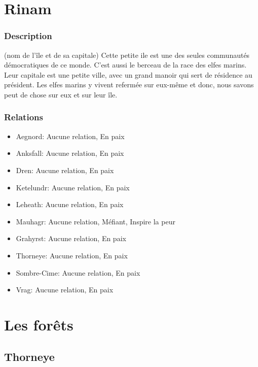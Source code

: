 \section{Rinam}
\subsubsection{Description}
\hypertarget{rinam}{}(nom de l’île et de sa capitale) Cette petite ile est une des seules communautés démocratiques de ce monde.
C'est aussi le berceau de la race des elfes marins.
Leur capitale est une petite ville, avec un grand manoir qui sert de résidence au président.
Les elfes marins y vivent refermée sur eux-même et donc, nous savons peut de chose sur eux et sur leur île.
\subsubsection{Relations} 
\begin{itemize}
\item Aegnord: Aucune relation, En paix   
\item Anksfall: Aucune relation, En paix 
\item Dren: Aucune relation, En paix 
\item Ketelundr: Aucune relation, En paix 
\item Leheath: Aucune relation, En paix 
\item Mauhagr: Aucune relation, Méfiant, Inspire la peur   
\item Grahyrst: Aucune relation, En paix 
\item Thorneye: Aucune relation, En paix  
\item Sombre-Cime: Aucune relation, En paix 
\item Vrag: Aucune relation, En paix 
\end{itemize}
\section{Les forêts}
\subsection{Thorneye}
